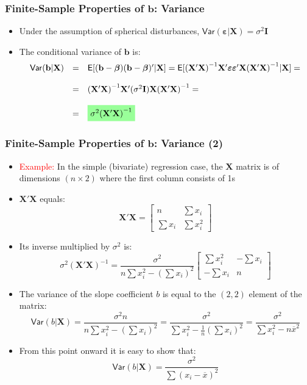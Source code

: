 \documentclass[10pt]{beamer}
\newcommand{\var}{\mathsf{Var}}
\theoremstyle{definition}
\begin{document}
\begin{frame}[fragile]
\frametitle{Finite-Sample Properties of $\mathbf{b}$: Variance}
\begin{itemize}
	\item Under the assumption of spherical disturbances, $\var(\bm\varepsilon|\mathbf{X}) = \sigma^{2}\mathbf{I}$
	\item The conditional variance of $\mathbf{b}$ is:
	\[
		\begin{array}{lcl}
			\var(\mathbf{b|X}) & = & \mathsf{E}[(\mathbf{b}-\bm\beta)(\mathbf{b}-\bm\beta)'|\mathbf{X}] = \mathsf{E}[\mathbf{(X'X)}^{-1}\mathbf{X'}\bm\varepsilon\bm\varepsilon'\mathbf{X(X'X)}^{-1}|\mathbf{X}] = \\
			\quad\\
			& = & \mathbf{(X'X)}^{-1}\mathbf{X'}(\sigma^{2}\mathbf{I})\mathbf{X(X'X)}^{-1} = \\
			\quad\\
			& = & \tikz[baseline]{
				\node[fill=green!40,anchor=base] (t1)
				{$ 	\sigma^{2}\mathbf{(X'X)}^{-1}$};
			}
		\end{array}
	\]
	
\end{itemize}
\end{frame}

\begin{frame}[fragile]
\frametitle{Finite-Sample Properties of $\mathbf{b}$: Variance (2)}
\begin{itemize}
	\item \textcolor{red}{Example:} In the simple (bivariate) regression case, the $\mathbf{X}$ matrix is of dimensions $(n\times 2)$ where the first column consists of 1s
	\item $\mathbf{X'X}$ equals:
	\[
	\mathbf{X'X} = 
	\left[
	\begin{matrix}
	n & \sum x_{i}\\
	\sum x_{i} & \sum x_{i}^{2}
	\end{matrix}
	\right]
	\]
	\item Its inverse multiplied by $\sigma^{2}$ is:
	\[
		\sigma^{2}\mathbf{(X'X)}^{-1} = \frac{\sigma^{2}}{n\sum x_{i}^{2} - \left(\sum x_{i}\right)^{2}}
		\left[
			\begin{matrix}
				\sum x_{i}^{2} & -\sum x_{i}\\
				-\sum x_{i} & n
			\end{matrix}
		\right]
	\]
	\item The variance of the slope coefficient $b$ is equal to the $(2,2)$ element of the matrix:
	\[
		\var(b|\mathbf{X}) = \frac{\sigma^{2}n}{n\sum x_{i}^{2} - \left(\sum x_{i}\right)^{2}} = \frac{\sigma^{2}}{\sum x_{i}^{2} - \frac{1}{n}\left(\sum x_{i}\right)^{2}} = \frac{\sigma^{2}}{\sum x_{i}^{2} - n\overline{x}^{2}}
	\]
	\item From this point onward it is easy to show that:
	\[
		\var(b|\mathbf{X}) = \frac{\sigma^{2}}{\sum (x_{i} - \overline{x})^{2}} 
	\]
\end{itemize}
\end{frame}
\end{document}
